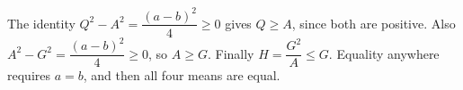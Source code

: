 The identity $Q^2-A^2=\dfrac{(a-b)^2}{4}\ge0$ gives $Q\ge A$, since both are positive. Also $A^2-G^2=\dfrac{(a-b)^2}{4}\ge0$, so $A\ge G$. Finally $H=\dfrac{G^2}{A}\le G$. Equality anywhere requires $a=b$, and then all four means are equal.
